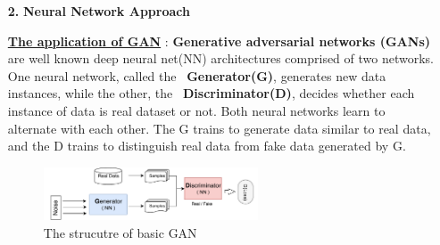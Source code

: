 \documentclass[11pt]{article}
\begin{document}
\begin{itemize}
	
		
	\item[\textbf{2.}] \textbf{Neural Network Approach}

	\item[]\underline{\textbf{The application of GAN}} : \textbf{Generative adversarial networks (GANs)} are well known deep neural net(NN) architectures comprised of two networks. One neural network, called the  \textbf{Generator(G)}, generates new data instances, while the other, the  \textbf{Discriminator(D)}, decides whether each instance of data is real dataset or not. Both neural networks learn to alternate with each other. The G trains to generate data similar to real data, and the D trains to distinguish real data from fake data generated by G. 

		\begin{figure}[h] 
		\begin{center}
			\includegraphics[width=0.6\textwidth]{GAN_basic}
			\caption{The strucutre of basic GAN} \label{fig:GAN-basic}
		\end{center}
	\end{figure}


\end{itemize}
\end{document}
